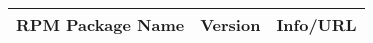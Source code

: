 \small
\begin{tabularx}{\textwidth}{l|c|X}
\toprule
{\bf RPM Package Name} & {\bf Version} & {\bf Info/URL}  \\ 
\midrule

\bottomrule
\end{tabularx}
